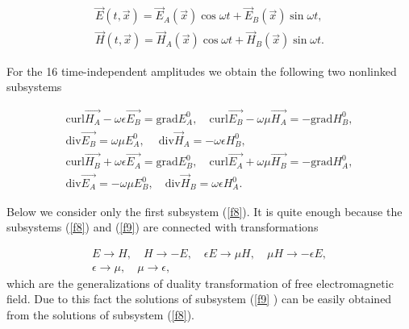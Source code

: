 \documentclass[a4paper,12pt]{article}
\begin{document}
\begin{equation}  \label{f7}
\begin{array}{c}
\overrightarrow{E}(t,\overrightarrow{x})=\overrightarrow{E}_A(
\overrightarrow{x})\cos \omega t+\overrightarrow{E}_B(\overrightarrow{x}
)\sin \omega t, \\
\overrightarrow{H}(t,\overrightarrow{x})=\overrightarrow{H }_A(%
\overrightarrow{x})\cos \omega t+\overrightarrow{H}_B(\overrightarrow{x}
)\sin \omega t.
\end{array}
\end{equation}

For the 16 time-independent amplitudes we obtain the following two nonlinked
subsystems

\begin{equation}
\begin{array}{c}
\mathrm{curl}\overrightarrow{H_A}-\omega \epsilon \overrightarrow{E_B}=%
\mathrm{grad}E_A^0,\quad \mathrm{curl}\overrightarrow{E_B}-\omega \mu
\overrightarrow{H_A}=-\mathrm{grad}H_B^0, \\
\mathrm{div}\overrightarrow{E_B}=\omega \mu E_A^0,\quad \mathrm{\ div}%
\overrightarrow{H}_A=-\omega \epsilon H_B^0,
\end{array}
\label{f8}
\end{equation}
\begin{equation}
\begin{array}{c}
\mathrm{curl}\overrightarrow{H_B}+\omega \epsilon \overrightarrow{E_A}=%
\mathrm{grad}E_B^0,\quad \mathrm{curl}\overrightarrow{E_A}+\omega \mu
\overrightarrow{H_B}=-\mathrm{grad}H_A^0, \\
\mathrm{div}\overrightarrow{E_A}=-\omega \mu E_B^0,\quad \mathrm{div}%
\overrightarrow{H}_B=\omega \epsilon H_A^0.
\end{array}
\label{f9}
\end{equation}

Below we consider only the first subsystem (\ref{f8}). It is quite enough
because the subsystems (\ref{f8}) and (\ref{f9}) are connected with
transformations

\begin{equation}
\begin{array}{c}
E\longrightarrow H,\quad H\longrightarrow -E,\quad \epsilon E\longrightarrow
\mu H,\quad \mu H\longrightarrow -\epsilon E, \\
\epsilon \longrightarrow \mu ,\quad \mu \longrightarrow \epsilon ,
\end{array}
\label{f10}
\end{equation}
which are the generalizations of duality transformation of free
electromagnetic field. Due to this fact the solutions of subsystem (\ref{f9}%
) can be easily obtained from the solutions of subsystem (\ref{f8}).
\end{document}
